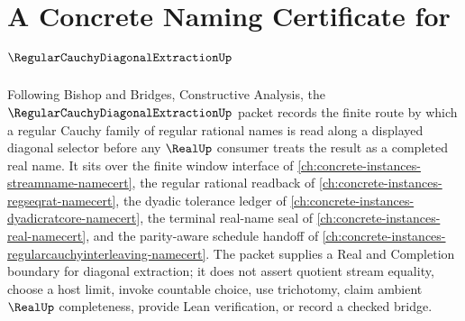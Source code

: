 \chapter{A Concrete Naming Certificate for $\RegularCauchyDiagonalExtractionUp$}
\label{ch:concrete-instances-regular-cauchy-diagonal-extraction-namecert}

Following Bishop and Bridges, Constructive Analysis, the $\RegularCauchyDiagonalExtractionUp$ packet records the finite route by which a regular Cauchy family of regular rational names is read along a displayed diagonal selector before any $\RealUp$ consumer treats the result as a completed real name. It sits over the finite window interface of \autoref{ch:concrete-instances-streamname-namecert}, the regular rational readback of \autoref{ch:concrete-instances-regseqrat-namecert}, the dyadic tolerance ledger of \autoref{ch:concrete-instances-dyadicratcore-namecert}, the terminal real-name seal of \autoref{ch:concrete-instances-real-namecert}, and the parity-aware schedule handoff of \autoref{ch:concrete-instances-regularcauchyinterleaving-namecert}. The packet supplies a Real and Completion boundary for diagonal extraction; it does not assert quotient stream equality, choose a host limit, invoke countable choice, use trichotomy, claim ambient $\RealUp$ completeness, provide Lean verification, or record a checked bridge.

